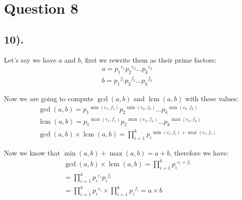 \documentclass[12pt]{article}
\begin{document}
\section*{Question 8}
\subsection*{10).}
Let's say we have $a$ and $b$, first we rewrite them as their prime factors:
\begin{gather*}
    a = {p_{1}}^{e_{1}} {p_{2}}^{e_{2}} \ldots {p_{k}}^{e_{k}} \\
    b = {p_{1}}^{f_{1}} {p_{2}}^{f_{2}} \ldots {p_{k}}^{f_{k}}
\end{gather*}

Now we are going to compute $\gcd(a, b)$ and $\operatorname{lcm}(a, b)$ with these values:
\begin{gather*}
    \gcd(a, b) = {p_{1}}^{\min(e_{1}, f_{1})} {p_{2}}^{\min(e_{2}, f_{2})} \ldots {p_{k}}^{\min(e_{k}, f_{k})} \\
    \operatorname{lcm}(a, b) = {p_{1}}^{\max(e_{1}, f_{1})} {p_{2}}^{\max(e_{2}, f_{2})} \ldots {p_{k}}^{\max(e_{k}, f_{k})} \\
    \gcd(a, b) \times \operatorname{lcm}(a, b) = \prod_{i=1}^{k} {p_{i}}^{\min(e_{i}, f_{i})+\max(e_{i}, f_{i})}
\end{gather*}

Now we know that $\min(a, b) + \max(a, b) = a+b$, therefore we have:
\begin{gather*}
    \gcd(a, b) \times \operatorname{lcm}(a, b) = \prod_{i=1}^{k} {p_{i}}^{e_{i} + f_{i}} \\
    = \prod_{i=1}^{k} {p_{i}}^{e_{i}} {p_{i}}^{f_{i}} \\
    = \prod_{i=1}^{k} {p_{i}}^{e_{i}} \times \prod_{i=1}^{k} {p_{i}}^{f_{i}} = a \times b
\end{gather*}
\end{document}
